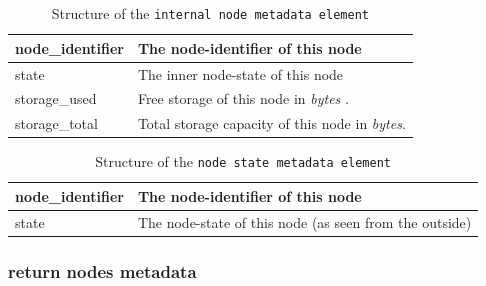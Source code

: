 \begin{table}[H]
    \begin{tabu}{| >{\ttfamily}l | X |}
        \hline
        node\_identifier
        & The \gls{node-identifier} of this \gls{node}\\

        \hline
        state
        & The inner \gls{node-state} of this \gls{node}\\
        
        \hline
        storage\_used
        & Free \gls{storage} of this \gls{node} in \emph{bytes} . \\

        \hline
        storage\_total
        & Total \gls{storage} capacity of this \gls{node} in \emph{bytes}. \\
        \hline
    \end{tabu}
    \caption{Structure of the \texttt{internal node metadata element}}
    \label{tab:internal-node-metadata-element}
\end{table}

\begin{table}[H]
    \begin{tabu}{| >{\ttfamily}l | X |}
        \hline
        node\_identifier
        & The \gls{node-identifier} of this \gls{node}\\

        \hline
        state
        & The \gls{node-state} of this \gls{node} (as seen from the outside)\\
        \hline
    \end{tabu}
    \caption{Structure of the \texttt{node state metadata element}}
    \label{tab:node-state-metadata-element}
\end{table}


\subsubsection{return nodes metadata}\label{sec:return-nodes-metadata}

